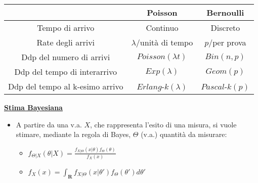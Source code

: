 \documentclass[8pt]{extarticle}
\begin{document}
\begin{multicols*}{3}
\begin{itemize}
                \begin{tabular}{ |c|c|c| } 
                 \hline
                  & Poisson & Bernoulli \\ 
                 \hline
                 Tempo di arrivo & Continuo & Discreto \\ 
                 Rate degli arrivi & $\lambda$/unità di tempo & $p$/per prova \\
                 Ddp del numero di arrivi & $Poisson(\lambda t)$ & $Bin(n,p)$ \\
                 Ddp del tempo di interarrivo & $Exp(\lambda)$ & $Geom(p)$ \\
                 Ddp del tempo al k-esimo arrivo & $Erlang$-$k(\lambda)$ & $Pascal$-$k(p)$ \\
                 \hline
                \end{tabular}
    \end{itemize}

    \textbf{\underline{Stima Bayesiana}}
    \begin{itemize}
        \item A partire da una v.a. $X$, che rappresenta l'esito di una misura, si vuole stimare, mediante la regola di Bayes, $\Theta$ (v.a.) quantità da misurare: 
        \begin{itemize}
            \item $f_{\Theta|X}(\theta|X)=\frac{f_{X|\Theta}(x|\theta)f_{\Theta}(\theta)}{f_{X}(x)}$
            \item $f_{X}(x)=\int_{\mathbf{R}}f_{X|\Theta}(x|\theta')f_{\Theta}(\theta')d\theta'$
        \end{itemize}
        

\end{itemize}
\end{multicols*}
\end{document}
